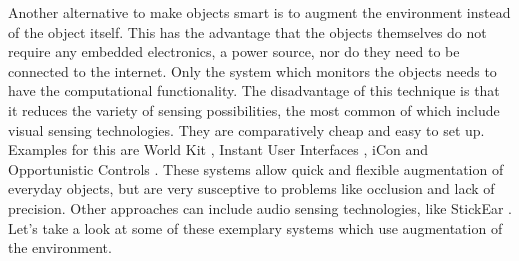 Another alternative to make objects smart is to augment the environment instead of the object itself. 
This has the advantage that the objects themselves do not require any embedded electronics, a power source, nor do they need to be connected to the internet. 
Only the system which monitors the objects needs to have the computational functionality. 
The disadvantage of this technique is that it reduces the variety of sensing possibilities, the most common of which include visual sensing technologies. 
They are comparatively cheap and easy to set up. 
Examples for this are World Kit \cite{xiao13}, Instant User Interfaces \cite{corsten13}, iCon \cite{cheng10} and Opportunistic Controls \cite{henderson08}. 
These systems allow quick and flexible augmentation of everyday objects, but are very susceptive to problems like occlusion and lack of precision.
Other approaches can include audio sensing technologies, like StickEar \cite{yeo13}. Let's take a look at some of these exemplary systems which use augmentation of the environment.

